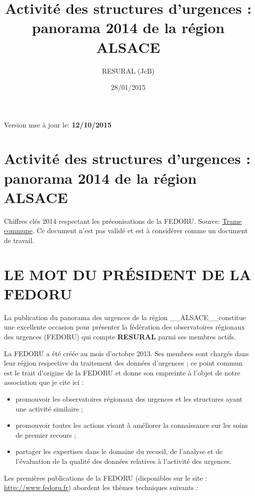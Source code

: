 \documentclass[]{article}
\title{Activité des structures d'urgences : panorama 2014 de la région ALSACE}
\author{RESURAL (JcB)}
\date{28/01/2015}
\begin{document}
\maketitle


{
\hypersetup{linkcolor=black}
\setcounter{tocdepth}{3}
\tableofcontents
}
Version mse à jour le: \textbf{12/10/2015}

\section{Activité des structures d'urgences : panorama 2014 de la région
ALSACE}\label{activite-des-structures-durgences-panorama-2014-de-la-region-alsace}

Chiffres clés 2014 respectant les préconisations de la FEDORU. Source:
\href{https://docs.google.com/document/d/101LYVqVLeHZnrujfMm3aqBYfbOwx3CPEB3Y-Lbud2Ls/edit}{Trame
commune}. Ce document n'est pas validé et est à considérer comme un
document de travail.

\section{LE MOT DU PRÉSIDENT DE LA
FEDORU}\label{le-mot-du-president-de-la-fedoru}

La publication du panorama des urgences de la région
\_\_ALSACE\_\_constitue une excellente occasion pour présenter la
fédération des observatoires régionaux des urgences (FEDORU) qui compte
\textbf{RESURAL} parmi ses membres actifs.

La FEDORU a été créée au mois d'octobre 2013. Ses membres sont chargés
dans leur région respective du traitement des données d'urgences ; ce
point commun est le trait d'origine de la FEDORU et donne son empreinte
à l'objet de notre association que je cite ici :

\begin{itemize}
\itemsep1pt\parskip0pt
\item
  promouvoir les observatoires régionaux des urgences et les structures
  ayant une activité similaire ;
\item
  promouvoir toutes les actions visant à améliorer la connaissance sur
  les soins de premier recours ;
\item
  partager les expertises dans le domaine du recueil, de l'analyse et de
  l'évaluation de la qualité des données relatives à l'activité des
  urgences.
\end{itemize}

Les premières publications de la FEDORU (disponibles sur le site :
\url{http://www.fedoru.fr}) abordent les thèmes techniques suivants :
\end{document}
